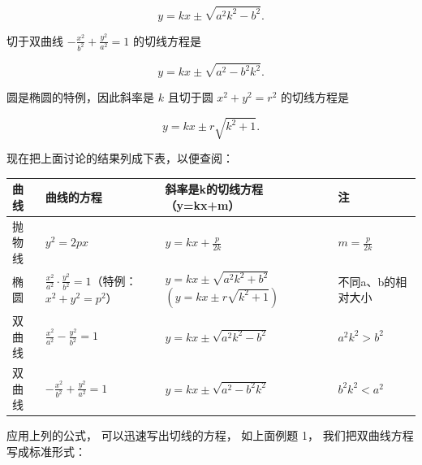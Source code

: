 \[
y = k x \pm \sqrt {a^{2} k^{2} - b^{2}}.
\]

切于双曲线 \(-\frac{x^2}{b^2} + \frac{y^2}{a^2} = 1\) 的切线方程是

\[
y = k x \pm \sqrt {a^{2} - b^{2} k^{2}}.
\]

圆是椭圆的特例，因此斜率是 \(k\) 且切于圆 \(x^{2} + y^{2} = r^{2}\)
的切线方程是

\[
y = k x \pm r \sqrt {k^{2} + 1}.
\]

现在把上面讨论的结果列成下表，以便查阅：

{\def\LTcaptype{none} %
\begin{longtable}[]{@{}
  >{\raggedright\arraybackslash}p{}
  >{\raggedright\arraybackslash}p{}
  >{\raggedright\arraybackslash}p{}
  >{\raggedright\arraybackslash}p{}@{}}
\toprule\noalign{}
\begin{minipage}[b]{\linewidth}\raggedright
曲线
\end{minipage} & \begin{minipage}[b]{\linewidth}\raggedright
曲线的方程
\end{minipage} & \begin{minipage}[b]{\linewidth}\raggedright
斜率是k的切线方程（y=kx+m）
\end{minipage} & \begin{minipage}[b]{\linewidth}\raggedright
注
\end{minipage} \\
\midrule\noalign{}
\endhead
\bottomrule\noalign{}
\endlastfoot
抛物线 & \(y^{2}=2px\) & \(y=kx+\frac{p}{2k}\) & \(m=\frac{p}{2k}\) \\
椭圆 &
\(\frac{x^{2}}{a^{2}}\cdot\frac{y^{2}}{b^{2}}=1\)（特例：\(x^{2}+y^{2}=p^{2}\)）
& \(y=kx\pm\sqrt{a^{2}k^{2}+b^{2}}\)\((y=kx\pm r\sqrt{k^{2}+1})\) &
不同a、b的相对大小 \\
双曲线 & \(\frac{x^{2}}{a^{2}}-\frac{y^{2}}{b^{2}}=1\) &
\(y=kx\pm\sqrt{a^{2}k^{2}-b^{2}}\) & \(a^{2}k^{2}>b^{2}\) \\
双曲线 & \(-\frac{x^{2}}{b^{2}}+\frac{y^{2}}{a^{2}}=1\) &
\(y=kx\pm\sqrt{a^{2}-b^{2}k^{2}}\) & \(b^{2}k^{2}<a^{2}\) \\
\end{longtable}
}

应用上列的公式， 可以迅速写出切线的方程， 如上面例题 1，
我们把双曲线方程写成标准形式：

